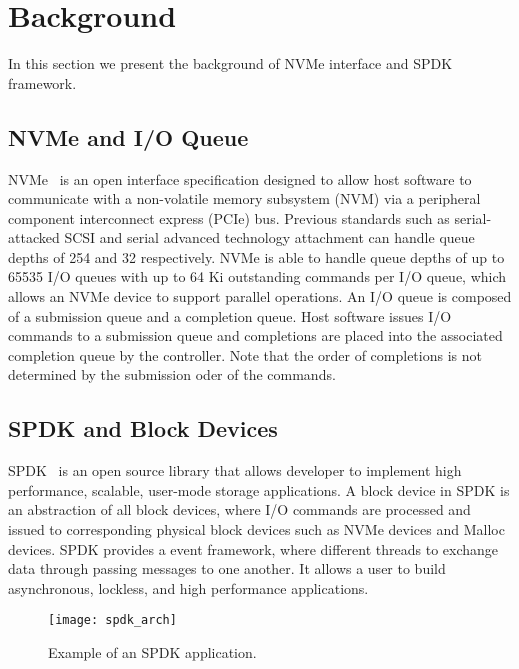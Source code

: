 \section{Background}

In this section we present the background of NVMe interface and SPDK 
framework.

\subsection{NVMe and I/O Queue}

NVMe~\cite{nvme} is an open interface specification designed to allow host
software to communicate with a non-volatile memory subsystem (NVM) via a 
peripheral component interconnect express (PCIe) bus. Previous standards
such as serial-attacked SCSI and serial advanced technology attachment
can handle queue depths of 254 and 32 respectively. NVMe is able to 
handle queue depths of up to 65535 I/O queues with up to 64 Ki outstanding
commands per I/O queue, which allows an NVMe device to support parallel
operations. An I/O queue is composed of a submission queue and a completion
queue. Host software issues I/O commands to a submission queue and completions
are placed into the associated completion queue by the controller. Note that
the order of completions is not determined by the submission oder of the commands.

\subsection{SPDK and Block Devices}

SPDK~\cite{spdk} is an open source library that allows developer to implement
high performance, scalable, user-mode storage applications. A block device 
in SPDK is an abstraction of all block devices, where I/O commands are 
processed and issued to corresponding physical block devices such as NVMe 
devices and Malloc devices. SPDK provides a event framework, where  
different threads to exchange data through passing messages to one another.
It allows a user to build asynchronous, lockless, and high performance
applications.

\begin{figure}
  \centering
  \texttt{[image: spdk\_arch]}
  \caption{Example of an SPDK application.}
  \label{fig:spdk_arch}
\end{figure}

